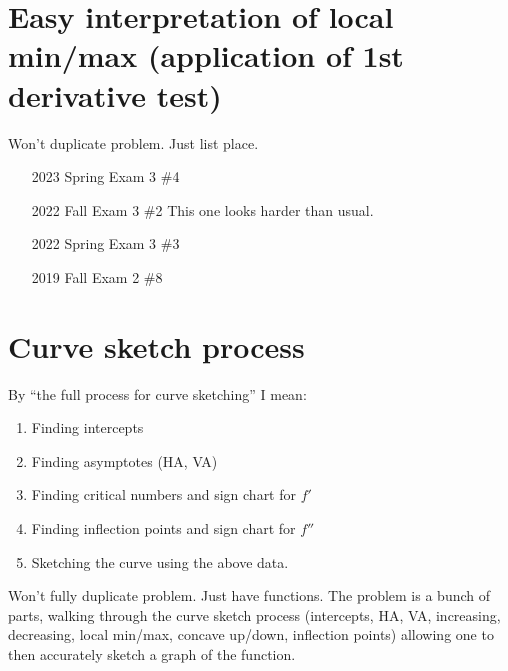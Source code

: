 \documentclass[10pt]{scrartcl}
\theoremstyle{definition}
\begin{document}
\section{Easy interpretation of local min/max (application of 1st derivative test)}
Won't duplicate problem. Just list place.
\begin{enumerate}
\item [2023 Spring Exam 3 \#4]
\item [2022 Fall Exam 3 \#2] This one looks harder than usual.
\item [2022 Spring Exam 3 \#3]
\item [2019 Fall Exam 2 \#8]
\end{enumerate}

\newpage
\section{Curve sketch process}
\begin{tcolorbox}
  By ``the full process for curve sketching'' I mean:
  \begin{enumerate}
  \item Finding intercepts
  \item Finding asymptotes (HA, VA)
  \item Finding critical numbers and sign chart for $f'$
  \item Finding inflection points and sign chart for $f''$
  \item Sketching the curve using the above data.
  \end{enumerate}
\end{tcolorbox}
Won't fully duplicate problem. Just have functions.
The problem is a bunch of parts, walking through the curve sketch process (intercepts, HA, VA, increasing, decreasing, local min/max, concave up/down, inflection points) allowing one to then accurately sketch a graph of the function.
\end{document}
